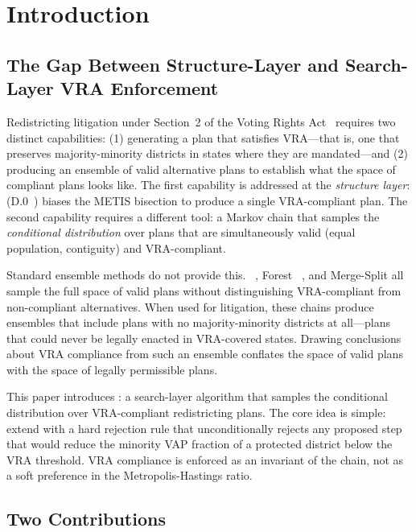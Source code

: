 \section{Introduction}
\label{sec:introduction}

\subsection{The Gap Between Structure-Layer and Search-Layer VRA Enforcement}

Redistricting litigation under Section~2 of the Voting Rights
Act~\citep{gingles1986} requires two distinct capabilities: (1) generating a
plan that satisfies VRA---that is, one that preserves majority-minority
districts in states where they are mandated---and (2) producing an ensemble
of valid alternative plans to establish what the space of compliant plans looks
like.
The first capability is addressed at the \emph{structure layer}: \vraSection{}
(D.0~\citep{dellaLibera2026vraSection}) biases the METIS bisection to produce
a single VRA-compliant plan.
The second capability requires a different tool: a Markov chain that samples the
\emph{conditional distribution} over plans that are simultaneously valid (equal
population, contiguity) and VRA-compliant.

Standard ensemble methods do not provide this.
\recom{}~\citep{deford2021}, Forest \recom{}~\citep{mccartan2020,dellaLibera2026forestRecom},
and Merge-Split all sample the full space of valid plans without distinguishing
VRA-compliant from non-compliant alternatives.
When used for litigation, these chains produce ensembles that include plans
with no majority-minority districts at all---plans that could never be legally
enacted in VRA-covered states.
Drawing conclusions about VRA compliance from such an ensemble conflates the
space of valid plans with the space of legally permissible plans.

This paper introduces \vr{}: a search-layer algorithm that samples the
conditional distribution over VRA-compliant redistricting plans.
The core idea is simple: extend \fr{} with a hard rejection rule that
unconditionally rejects any proposed step that would reduce the minority VAP
fraction of a protected district below the VRA threshold.
VRA compliance is enforced as an invariant of the chain, not as a soft
preference in the Metropolis-Hastings ratio.

\subsection{Two Contributions}

